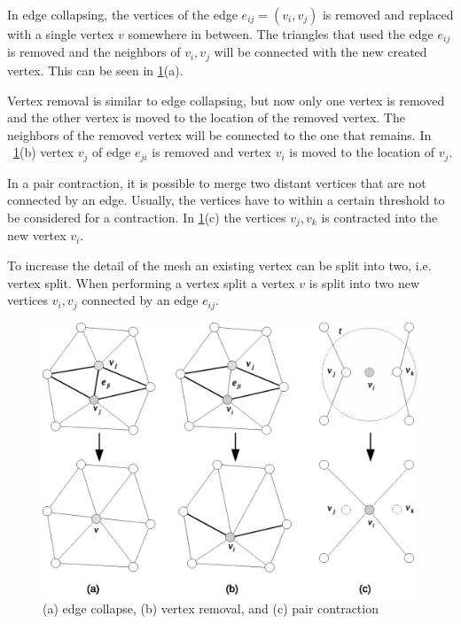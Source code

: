 In edge collapsing, the vertices of the edge $e_{ij} = (v_i, v_j)$ is removed and replaced with a single vertex $v$ somewhere in between. The triangles that used the edge $e_{ij}$ is removed and the neighbors of $v_i, v_j$ will be connected with the new created vertex. This can be seen in \cref{fig:mesh_transformations}(a).

Vertex removal is similar to edge collapsing, but now only one vertex is removed and the other vertex is moved to the location of the removed vertex. The neighbors of the removed vertex will be connected to the one that remains. In ~\cref{fig:mesh_transformations}(b) vertex $v_j$ of edge $e_{ji}$ is removed and vertex $v_i$ is moved to the location of $v_j$.

In a pair contraction, it is possible to merge two distant vertices that are not connected by an edge. Usually, the vertices have to within a certain threshold to be considered for a contraction. In \cref{fig:mesh_transformations}(c) the vertices $v_j, v_k$ is contracted into the new vertex $v_i$. 

To increase the detail of the mesh an existing vertex can be split into two, i.e. vertex split. When performing a vertex split a vertex $v$ is split into two new vertices $v_i, v_j$ connected by an edge $e_{ij}$. 

\begin{figure}[h]
    \centering
    \includegraphics[width=\textwidth]{figures/mesh_transformations.eps}
    \caption{(a) edge collapse, (b) vertex removal, and (c) pair contraction}
    \label{fig:mesh_transformations}
\end{figure}
\fi %

